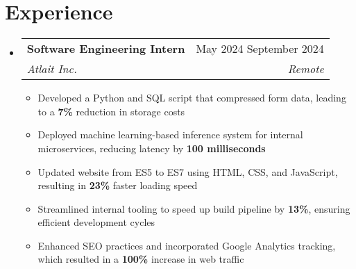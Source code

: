 \documentclass[letterpaper, 11pt]{article}
\makeatletter
\newcommand{\resumeItem}[1]{
    \item \small {
        {#1 \vspace{-3pt}} %
    }
}
\newcommand{\resumeSubheading}[4]{ %
  \vspace{-2pt}\item
    \begin{tabular*}{0.99\textwidth}[t]{l@{\extracolsep{\fill}}r}
      \textbf{#1} & #2 \\
      \textit{\small#3} & \textit{\small #4} \\
    \end{tabular*}\vspace{-7pt}
}
\newcommand{\resumeSubHeadingListStart}{\begin{itemize}[leftmargin=0.15in, label={}]}
\newcommand{\resumeSubHeadingListEnd}{\end{itemize}}
\newcommand{\resumeItemListStart}{\begin{itemize}}
\newcommand{\resumeItemListEnd}{\end{itemize}\vspace{-10pt}}
\makeatother
\begin{document}
\vspace{-15pt}

\section{Experience}
    \resumeSubHeadingListStart{}
        \resumeSubheading %
        {Software Engineering Intern}{May 2024 \textendash{} September 2024}
        {Atlait Inc.}{Remote}
        \resumeItemListStart{}
            \resumeItem{Developed a Python and SQL script that compressed form data, leading to a \textbf{7\%} reduction in storage costs}
            \resumeItem{Deployed machine learning-based inference system for internal microservices, reducing latency by \textbf{100 milliseconds}}
            \resumeItem{Updated website from ES5 to ES7 using HTML, CSS, and JavaScript, resulting in \textbf{23\%} faster loading speed}
            \resumeItem{Streamlined internal tooling to speed up build pipeline by \textbf{13\%}, ensuring efficient development cycles}
            \resumeItem{Enhanced SEO practices and incorporated Google Analytics tracking, which resulted in a \textbf{100\%} increase in web traffic}
        \resumeItemListEnd{}
    \resumeSubHeadingListEnd{}

\vspace{-20pt}

\end{document}
